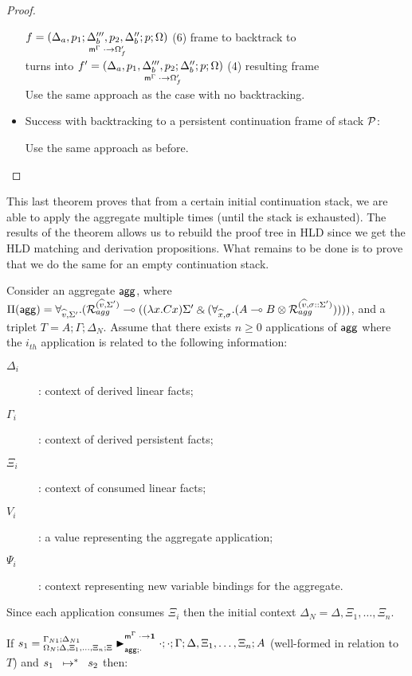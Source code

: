 \begin{proof}
\begin{itemize}[leftmargin=*]
      $f = \lframe{\Delta_a, p_1}{\Delta'''_b, p_2, \Delta''_b}{p}{\Omega}{\cdot}{\Omega'_f}$
      (6) frame to backtrack to \\
      turns into $f' = \lframe{\Delta_a, p_1, \Delta'''_b, p_2}{\Delta''_b}{p}{\Omega}{\cdot}{\Omega'_f}$
      \hfill (4) resulting frame \\

      Use the same approach as the case with no backtracking.
      
   \item Success with backtracking to a persistent continuation frame of stack
   $\lstack{P}$:

      Use the same approach as before.
      
\end{itemize}
\end{proof}

This last theorem proves that from a certain initial continuation stack, we are
able to apply the aggregate multiple times (until the stack is exhausted). The
results of the theorem allows us to rebuild the proof tree in HLD since we get
the HLD matching and derivation propositions. What remains to be done is to
prove that we do the same for an empty continuation stack.

\begin{lemma}\label{thm:aggregates}
Consider an aggregate $\m{agg}$, where $\Pi(\m{agg}) = \forall_{\widehat{v}, \Sigma'}.
   (\defstwo{agg}{\widehat{v}}{\Sigma'} \lolli ((\lambda x. C x)\Sigma' \with (\forall_{\widehat{x}, \sigma}.
                                                (A \lolli B \otimes
                                                 \defstwo{agg}{\widehat{v}}{\sigma
                                                 ::\Sigma'}))))$,
and a triplet $T = A; \Gamma; \Delta_{N}$.
Assume that there exists $n \geq 0$ applications of $\m{agg}$
where the $i_{th}$ application is related to the following information:
\begin{description}
   \item[$\Delta_i$]: context of derived linear facts;
   \item[$\Gamma_i$]: context of derived persistent facts;
   \item[$\Xi_i$]: context of consumed linear facts;
   \item[$V_i$]: a value representing the aggregate application;
   \item[$\Psi_i$]: context representing new variable bindings for the aggregate.
\end{description}

Since each application consumes $\Xi_i$ then the initial context $\Delta_N =
\Delta, \Xi_1, \dotsc, \Xi_n$.

If $s_1 = \matstatea{\Delta, \Xi_1, \dotsc, \Xi_n}{\cdot;
   \cdot}{\Gamma}{\Delta, \Xi_1, \dotsc, \Xi_n}{A}{\cdot \rightarrow \one}{\cdot}$
   (well-formed in relation to $T$) and $\transs{s_1}{s_2}$ then:



\end{lemma}

